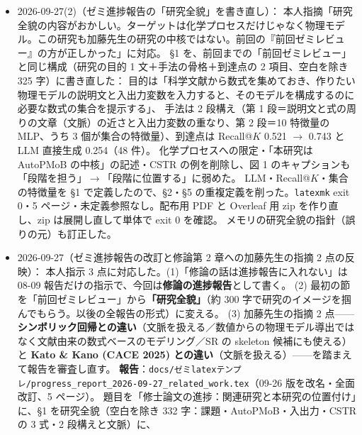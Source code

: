 \documentclass[11pt,a4paper]{jsarticle}
\begin{document}
\begin{itemize}[nosep]
    \S2 の 3 項目めを「特にシンボリック回帰と研究室の式の組合せ法との違いとして、本研究が数値データではなく文献由来の式に基づいてモデルを組み立て、その際に文脈を扱える点を明確にし、修論にも反映した」に改め、
    同じ趣旨の \S8 まとめの「加藤先生にご指摘いただいたとおり」も削った（本文に加藤先生の名前はなくなった。\texttt{.tex} 冒頭のコメントの経緯記録は残す）。
    \texttt{latexmk} exit 0・5 ページ。配布用 PDF と Overleaf 用 zip を作り直し、zip は展開し直して単体で exit 0 を確認。
  \item 2026-09-27(2)（ゼミ進捗報告の「研究全貌」を書き直し）：
    本人指摘「研究全貌の内容がおかしい。ターゲットは化学プロセスだけじゃなく物理モデル。この研究も加藤先生の研究の中核ではない。前回の『前回ゼミレビュー』の方が正しかった」に対応。
    \S1 を、前回までの「前回ゼミレビュー」と同じ構成（研究の目的 1 文＋手法の骨格＋到達点の 2 項目、空白を除き 325 字）に書き直した：
    目的は「科学文献から数式を集めておき、作りたい物理モデルの説明文と入出力変数を入力すると、そのモデルを構成するのに必要な数式の集合を提示する」、
    手法は 2 段構え（第 1 段＝説明文と式の周りの文章（文脈）の近さと入出力変数の重なり、第 2 段＝10 特徴量の MLP、うち 3 個が集合の特徴量）、到達点は Recall@$K$ 0.521 $\to$ 0.743 と LLM 直接生成 0.254（48 件）。
    化学プロセスへの限定・「本研究は AutoPMoB の中核」の記述・CSTR の例を削除し、図 1 のキャプションも「段階を担う」$\to$「段階に位置する」に弱めた。
    LLM・Recall@$K$・集合の特徴量を \S1 で定義したので、\S2・\S5 の重複定義を削った。\texttt{latexmk} exit 0・5 ページ・未定義参照なし。配布用 PDF と Overleaf 用 zip を作り直し、zip は展開し直して単体で exit 0 を確認。
    メモリの研究全貌の指針（誤りの元）も訂正した。
  \item 2026-09-27（ゼミ進捗報告の改訂と修論第 2 章への加藤先生の指摘 2 点の反映）：
    本人指示 3 点に対応した。(1)「修論の話は進捗報告に入れない」は 08-09 報告だけの指示で、今回は\textbf{修論の進捗報告}として書く。
    (2) 最初の節を「前回ゼミレビュー」から\textbf{「研究全貌」}（約 300 字で研究のイメージを掴んでもらう。以後の全報告の形式）に変える。
    (3) 加藤先生の指摘 2 点——\textbf{シンボリック回帰との違い}（文脈を扱える／数値からの物理モデル導出ではなく文献由来の数式ベースのモデリング／SR の skeleton 候補にも使える）と
    \textbf{Kato \& Kano (CACE 2025) との違い}（文脈を扱える）——を踏まえて報告を審査し直す。
    \textbf{報告}：\texttt{docs/ゼミlatexテンプレ/progress\_report\_2026-09-27\_related\_work.tex}（09-26 版を改名・全面改訂、5 ページ）。
    題目を「修士論文の進捗：関連研究と本研究の位置付け」に、\S1 を研究全貌（空白を除き 332 字：課題・AutoPMoB・入出力・CSTR の 3 式・2 段構えと文脈）に、

\end{itemize}
\end{document}
